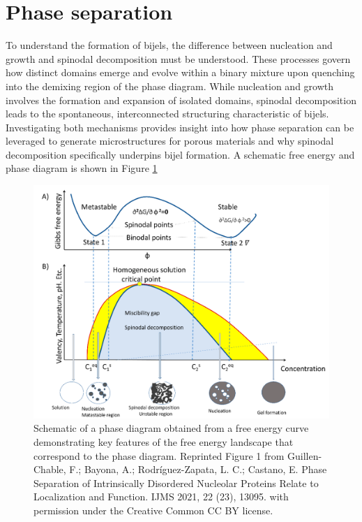 \section{Phase separation}

To understand the formation of bijels, the difference between nucleation and growth and spinodal decomposition must be understood. These processes 
govern how distinct domains emerge and evolve within a binary mixture upon quenching into the demixing region of the phase diagram. While nucleation and growth involves the formation 
and expansion of isolated domains, spinodal decomposition leads to the spontaneous, interconnected structuring characteristic of bijels. Investigating both mechanisms provides insight 
into how phase separation can be leveraged to generate microstructures for porous materials and why spinodal decomposition specifically underpins bijel formation. A schematic free 
energy and phase diagram is shown in Figure \ref{fig:phase_diagram}

\begin{figure}
    \centering
    \includegraphics[scale = 0.7]{../figures/literature_review/phase_diagram.png}
    \caption{Schematic of a phase diagram obtained from a free energy curve demonstrating key features of the free energy landscape that correspond
             to the phase diagram. Reprinted Figure 1 from
             Guillen-Chable, F.; Bayona, A.; Rodríguez-Zapata, L. C.; Castano, E. Phase Separation of Intrinsically Disordered 
             Nucleolar Proteins Relate to Localization and Function. IJMS 2021, 22 (23), 13095. with permission under the Creative Common CC BY license.}
    \label{fig:phase_diagram}
\end{figure}

